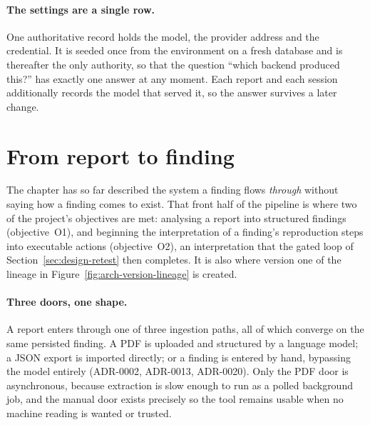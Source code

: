\paragraph{The settings are a single row.} One authoritative record holds the
model, the provider address and the credential. It is seeded once from the
environment on a fresh database and is thereafter the only authority, so that the
question ``which backend produced this?'' has exactly one answer at any moment.
Each report and each session additionally records the model that served it, so
the answer survives a later change.

\section{From report to finding}
\label{sec:design-ingest}

The chapter has so far described the system a finding flows \emph{through} without
saying how a finding comes to exist. That front half of the pipeline is where two
of the project's objectives are met: analysing a report into structured findings
(objective~O1), and beginning the interpretation of a finding's reproduction steps
into executable actions (objective~O2), an interpretation that the gated loop of
Section~\ref{sec:design-retest} then completes. It is also where version one of the
lineage in Figure~\ref{fig:arch-version-lineage} is created.

\paragraph{Three doors, one shape.} A report enters through one of three ingestion
paths, all of which converge on the same persisted finding. A PDF is uploaded and
structured by a language model; a JSON export is imported directly; or a finding is
entered by hand, bypassing the model entirely (ADR-0002, ADR-0013, ADR-0020). Only
the PDF door is asynchronous, because extraction is slow enough to run as a polled
background job, and the manual door exists precisely so the tool remains usable
when no machine reading is wanted or trusted.

